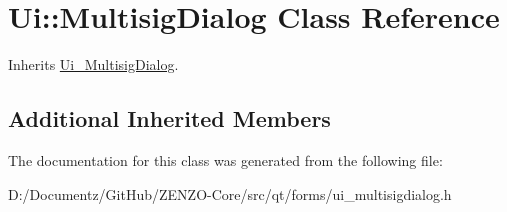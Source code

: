 \hypertarget{class_ui_1_1_multisig_dialog}{}\section{Ui\+::Multisig\+Dialog Class Reference}
\label{class_ui_1_1_multisig_dialog}


Inherits \mbox{\hyperlink{class_ui___multisig_dialog}{Ui\+\_\+\+Multisig\+Dialog}}.

\subsection*{Additional Inherited Members}


The documentation for this class was generated from the following file\+:\begin{DoxyCompactItemize}
\item 
D\+:/\+Documentz/\+Git\+Hub/\+Z\+E\+N\+Z\+O-\/\+Core/src/qt/forms/ui\+\_\+multisigdialog.\+h\end{DoxyCompactItemize}
